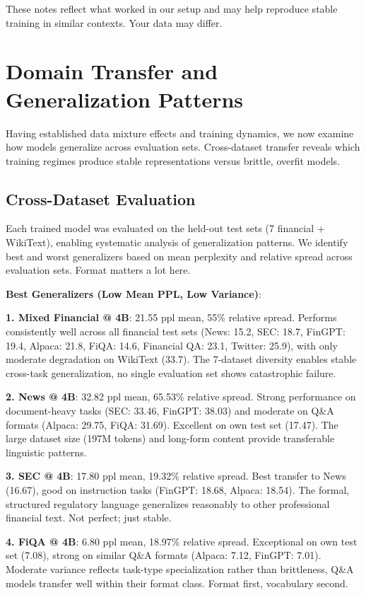 These notes reflect what worked in our setup and may help reproduce stable training in similar contexts. Your data may differ.

\section{Domain Transfer and Generalization Patterns}

Having established data mixture effects and training dynamics, we now examine how models generalize across evaluation sets. Cross-dataset transfer reveals which training regimes produce stable representations versus brittle, overfit models.

\subsection{Cross-Dataset Evaluation}

Each trained model was evaluated on the held-out test sets (7 financial + WikiText), enabling systematic analysis of generalization patterns. We identify best and worst generalizers based on mean perplexity and relative spread across evaluation sets. Format matters a lot here.

\textbf{Best Generalizers (Low Mean PPL, Low Variance)}:

\textbf{1. Mixed Financial @ 4B}: 21.55 ppl mean, 55\% relative spread. Performs consistently well across all financial test sets (News: 15.2, SEC: 18.7, FinGPT: 19.4, Alpaca: 21.8, FiQA: 14.6, Financial QA: 23.1, Twitter: 25.9), with only moderate degradation on WikiText (33.7). The 7-dataset diversity enables stable cross-task generalization, no single evaluation set shows catastrophic failure.

\textbf{2. News @ 4B}: 32.82 ppl mean, 65.53\% relative spread. Strong performance on document-heavy tasks (SEC: 33.46, FinGPT: 38.03) and moderate on Q\&A formats (Alpaca: 29.75, FiQA: 31.69). Excellent on own test set (17.47). The large dataset size (197M tokens) and long-form content provide transferable linguistic patterns.

\textbf{3. SEC @ 4B}: 17.80 ppl mean, 19.32\% relative spread. Best transfer to News (16.67), good on instruction tasks (FinGPT: 18.68, Alpaca: 18.54). The formal, structured regulatory language generalizes reasonably to other professional financial text. Not perfect; just stable.

\textbf{4. FiQA @ 4B}: 6.80 ppl mean, 18.97\% relative spread. Exceptional on own test set (7.08), strong on similar Q\&A formats (Alpaca: 7.12, FinGPT: 7.01). Moderate variance reflects task-type specialization rather than brittleness, Q\&A models transfer well within their format class. Format first, vocabulary second.

